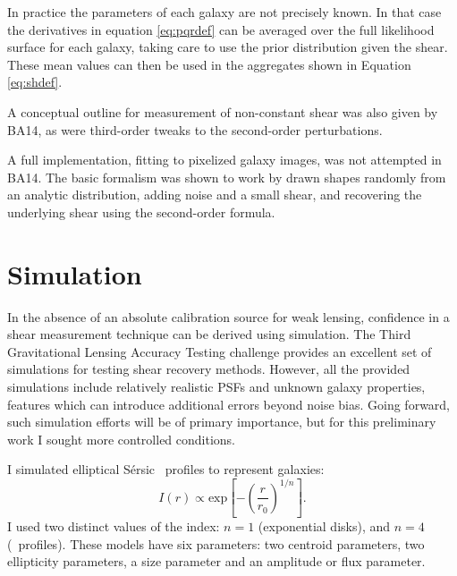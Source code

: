 \documentclass[usegraphicx,usenatbib]{mn2e}
\newcommand{\vecg}{\mbox{\boldmath $g$}}
\newcommand{\vecD}{\mbox{\boldmath $D$}}
\newcommand{\vecQ}{\mbox{\boldmath $Q$}}
\newcommand{\matR}{\mbox{$\bf R$}}
\newcommand{\bnabg}{ \boldsymbol{\nabla_g}}
\newcommand{\sersic}{S\'{e}rsic}
\begin{document}
In practice the parameters of each galaxy are not precisely known. In that case
the derivatives in equation \ref{eq:pqrdef} can be averaged over the full
likelihood surface for each galaxy, taking care to use the prior
distribution given the shear.  These mean values can then be used in the
aggregates shown in Equation \ref{eq:shdef}.

A conceptual outline for measurement of non-constant shear was also given by
BA14, as were third-order tweaks to the second-order perturbations.

A full implementation, fitting to pixelized galaxy images, was not attempted in
BA14.  The basic formalism was shown to work by drawn shapes randomly from an
analytic distribution, adding noise and a small shear, and recovering the
underlying shear using the second-order formula.

\section{Simulation} \label{sec:sim}

In the absence of an absolute calibration source for weak lensing, confidence
in a shear measurement technique can be derived using simulation.  The Third
Gravitational Lensing Accuracy Testing challenge \citep[GREAT3,][]{great3}
provides an excellent set of simulations for testing shear recovery methods.
However, all the provided simulations include relatively realistic PSFs and
unknown galaxy properties, features which can introduce additional errors
beyond noise bias.  Going forward, such simulation efforts will be of primary
importance, but for this preliminary work I sought more controlled conditions.

I simulated elliptical \sersic\ \citep{Sersic63} profiles to represent galaxies:
\begin{equation}
I(r) \propto \mathrm{exp} \left[ -\left( \frac{r}{r_0} \right)^{1/n} \right].
\end{equation}
I used two distinct values of the index: $n=1$ (exponential
disks), and $n=4$ (\devauc\ profiles).  These models have six parameters:
two centroid parameters, two ellipticity parameters, a size parameter
and an amplitude or flux parameter.
\end{document}
